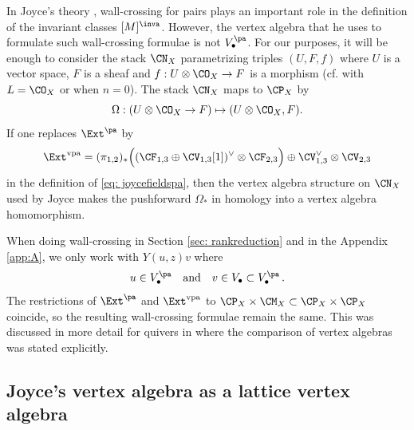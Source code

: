 \begin{remark}
\notready\label{rem: stackNX}
In Joyce's theory \cite[Section 8]{Jo21}, wall-crossing for pairs plays an important role in the definition of the invariant classes $[M]^\inva$. However, the vertex algebra that he uses to formulate such wall-crossing formulae is not $V_\bullet^{\pa}$. For our purposes, it will be enough to consider the stack $\CN_X$ parametrizing triples $(U,F,f)$ where $U$ is a vector space, $F$ is a sheaf and $f:U \otimes \CO_X\to F$ is a morphism (cf. \cite[Definition 8.2]{Jo21} with $L=\CO_X$ or \cite[Definition 2.12]{Bo21} when $n=0$). The stack $\CN_X$ maps to $\CP_X$ by
\[\Omega:(U\otimes \CO_X\to F)\mapsto (U\otimes \CO_X,  F).\]
If one replaces $\Ext^{\pa}$ by
$$
\Ext^{\text{vpa}} = (\pi_{1,2})_\ast\Big((\CF_{1,3}\oplus \CV_{1,3}[1])^\vee\otimes \CF_{2,3}\Big)\oplus \CV_{1,3}^\vee\otimes \CV_{2,3}
$$
in the definition of \eqref{eq: joycefieldspa},
then the vertex algebra structure on $\CN_X$ used by Joyce makes the pushforward $\Omega_*$ in homology into a vertex algebra homomorphism.

When doing wall-crossing in Section \ref{sec: rankreduction} and in the Appendix \ref{app:A}, we only work with $Y(u,z)v$ where
$$
u\in V^{\pa}_{\bullet}\quad \text{and}\quad v \in V_{\bullet}\subset V^{\pa}_{\bullet}\,.
$$
The restrictions of $\Ext^{\pa}$ and $\Ext^{\text{vpa}}$ to $\CP_X\times \CM_X\subset \CP_X\times \CP_X$ coincide, so the resulting wall-crossing formulae remain the same. This was discussed in more detail for quivers in \cite[Remark 3.5 and 3.12, Lemma 4.4]{BoVir} where the comparison of vertex algebras was stated explicitly.
\end{remark}




\subsection{Joyce's vertex algebra as a lattice vertex algebra}
\label{sec: grossiso}

